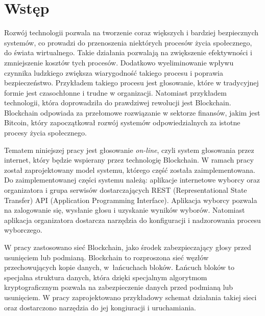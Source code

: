 \documentclass[a4paper,12pt]{book}
\newcounter{stronyPozaNumeracja}
\begin{document}
\vfill

\cleardoublepage

\pagestyle{tylkoNumeryStron}
\tableofcontents

\mainmatter
{}
\setcounter{stronyPozaNumeracja}{\value{page}}
\pagestyle{NumeryStronNazwyRozdzialow}


\chapter{Wstęp}

Rozwój technologii pozwala na tworzenie coraz większych i bardziej bezpiecznych systemów, co prowadzi do przenoszenia niektórych procesów życia społecznego, do świata wirtualnego. Takie działania pozwalają na zwiększenie efektywności i zmniejszenie kosztów tych procesów. Dodatkowo wyeliminowanie wpływu czynnika ludzkiego zwiększa wiarygodność takiego procesu i poprawia bezpieczeństwo. Przykładem takiego procesu jest głosowanie, które w tradycyjnej formie jest czasochłonne i trudne w organizacji. Natomiast przykładem technologii, która doprowadziła do prawdziwej rewolucji jest Blockchain. Blockchain odpowiada za przełomowe rozwiązanie w sektorze finansów, jakim jest Bitcoin, który zapoczątkował rozwój systemów odpowiedzialnych za istotne procesy życia społecznego.

Tematem niniejszej pracy jest głosowanie \textit{on-line}, czyli system głosowania przez internet, który będzie wspierany przez technologię Blockchain. W ramach pracy został zaprojektowany model systemu, którego część została zaimplementowana. Do zaimplementowanej części systemu należą: aplikacje internetowe wyborcy oraz organizatora i grupa serwisów dostarczających REST (Representational State Transfer) API (Application Programming Interface). Aplikacja wyborcy pozwala na zalogowanie się, wysłanie głosu i uzyskanie wyników wyborów. Natomiast aplikacja organizatora dostarcza narzędzia do konfiguracji i nadzorowania procesu wyborczego. 

W pracy zastosowano sieć Blockchain, jako środek zabezpieczający głosy przed usunięciem lub podmianą. Blockchain to rozproszona sieć węzłów przechowujących kopie danych, w~łańcuchach bloków. Łańcuch bloków to specjalna struktura danych, która dzięki specjalnym algorytmom kryptograficznym pozwala na zabezpieczenie danych przed podmianą lub usunięciem. W pracy zaprojektowano przykładowy schemat działania takiej sieci oraz dostarczono narzędzia do jej kongiuracji i uruchamiania.
\end{document}
